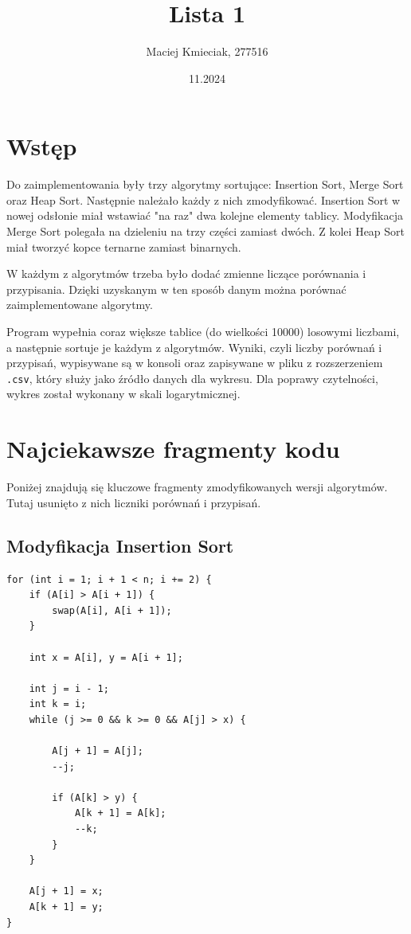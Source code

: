 \documentclass{article}
\title{Lista 1}
\author{Maciej Kmieciak, 277516}
\date{11.2024}
\begin{document}
\maketitle

\section{Wstęp}

Do zaimplementowania były trzy algorytmy sortujące: Insertion Sort, Merge Sort oraz Heap Sort. Następnie należało każdy z nich zmodyfikować. Insertion Sort w nowej odsłonie miał wstawiać "na raz" dwa kolejne elementy tablicy. Modyfikacja Merge Sort polegała na dzieleniu na trzy części zamiast dwóch. Z kolei Heap Sort miał tworzyć kopce ternarne zamiast binarnych.

W każdym z algorytmów trzeba było dodać zmienne liczące porównania i przypisania. Dzięki uzyskanym w ten sposób danym można porównać zaimplementowane algorytmy.

Program wypełnia coraz większe tablice (do wielkości 10000) losowymi liczbami, a następnie sortuje je każdym z algorytmów. Wyniki, czyli liczby porównań i przypisań, wypisywane są w konsoli oraz zapisywane w pliku z rozszerzeniem \texttt{.csv}, który służy jako źródło danych dla wykresu. Dla poprawy czytelności, wykres został wykonany w skali logarytmicznej.

\section{Najciekawsze fragmenty kodu}

Poniżej znajdują się kluczowe fragmenty zmodyfikowanych wersji algorytmów. Tutaj usunięto z nich liczniki porównań i przypisań.

\subsection{Modyfikacja Insertion Sort}

\begin{verbatim}
for (int i = 1; i + 1 < n; i += 2) {
    if (A[i] > A[i + 1]) {
        swap(A[i], A[i + 1]);
    }

    int x = A[i], y = A[i + 1];

    int j = i - 1;
    int k = i;
    while (j >= 0 && k >= 0 && A[j] > x) {

        A[j + 1] = A[j];
        --j;

        if (A[k] > y) {
            A[k + 1] = A[k];
            --k;
        }
    }

    A[j + 1] = x;
    A[k + 1] = y;
}
\end{verbatim}
\end{document}
